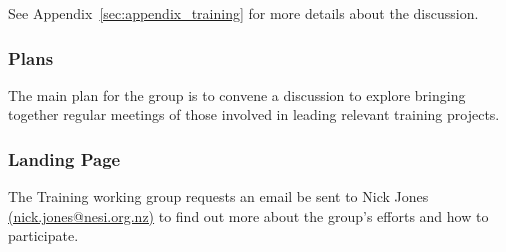 See Appendix~\ref{sec:appendix_training} for more details about the discussion.

\subsubsection{Plans}

The main plan for the group is to convene a discussion to explore bringing
together regular meetings of those involved in leading relevant training
projects.

\subsubsection{Landing Page}

The Training working group requests an email be sent to Nick Jones
\href{mailto:nick.jones@nesi.org.nz}{(nick.jones@nesi.org.nz)} to find out more
about the group's efforts and how to participate.
